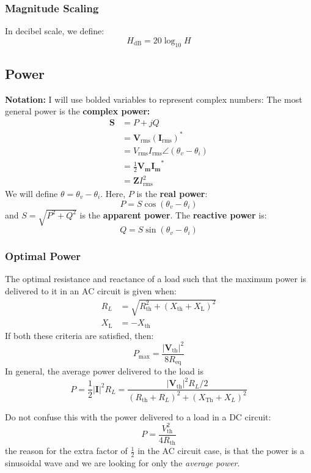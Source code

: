 \documentclass{article}
\begin{document}
\subsubsection{Magnitude Scaling}
In decibel scale, we define:
\begin{equation}
    H_\text{dB} = 20\log_{10}H
\end{equation}
\subsection{Power}
\textbf{Notation:} I will use bolded variables to represent complex numbers: The most general power is the \textbf{complex power:}
\begin{align}
    \bm{S} &= P + jQ \\
    &= \bm{V}_\text{rms}\left(\bm{I}_\text{rms}\right)^* \\ 
    &= V_\text{rms}I_\text{rms} \angle (\theta_v-\theta_i) \\ 
    &= \frac{1}{2}\bm{V_m}\bm{I_m}^* \\ 
    &= \bm{Z}I_\text{rms}^2
\end{align}
We will define $\theta=\theta_v-\theta_i$. Here, $P$ is the \textbf{real power}:
\begin{equation}
    P = S\cos(\theta_v-\theta_i)
\end{equation}
and $S=\sqrt{P^2+Q^2}$ is the \textbf{apparent power}. The \textbf{reactive power} is:
\begin{equation}
    Q = S\sin(\theta_v-\theta_i)
\end{equation}
\subsubsection{Optimal Power}
The optimal resistance and reactance of a load such that the maximum power is delivered to it in an AC circuit is given when:
\begin{align}
    R_L &= \sqrt{R_\text{th}^2 + (X_\text{th}+X_\text{L})^2} \\ 
    X_\text{L} &= - X_\text{th}
\end{align}
If both these criteria are satisfied, then:
\begin{equation}
    P_\text{max} = \frac{|\bm{V}_\text{th}|^2}{8R_\text{eq}}
\end{equation}
In general, the average power delivered to the load is
\begin{equation}
    P = \frac{1}{2}|\bm{I}|^2 R_L = \frac{|\bm{V}_\text{th}|^2R_L/2}{(R_\text{th}+R_L)^2+(X_\text{Th}+X_L)^2}
\end{equation}
\begin{warning}
    Do not confuse this with the power delivered to a load in a DC circuit:
    \begin{equation}
        P = \frac{V_\text{th}^2}{4R_\text{th}}
    \end{equation}
    the reason for the extra factor of $\frac{1}{2}$ in the AC circuit case, is that the power is a sinusoidal wave and we are looking for only the \textit{average power}.
\end{warning}
\end{document}
